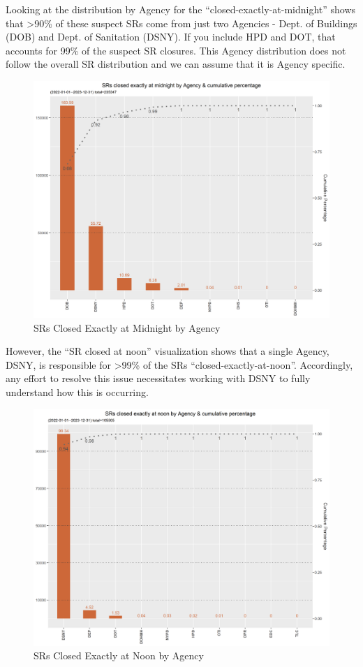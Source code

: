 \documentclass[12pt, titlepage]{article}
\begin{document}
	Looking at the distribution by Agency for the ``closed-exactly-at-midnight'' shows that \textgreater{}90\% of these suspect SRs come from just two Agencies - Dept. of 
	Buildings (DOB) and Dept. of Sanitation (DSNY). If you include HPD and DOT, that accounts for 99\% of the suspect SR closures. This Agency
	distribution does not follow the overall SR distribution and we can assume that it is Agency specific. 

	\begin{figure}[H]
		 \centering
		 \includegraphics[scale = 0.65]{closed_at_midnight_chart.png}
		 \caption{SRs Closed Exactly at Midnight by Agency}
		 \label{fig:midnight-closed}
	\end{figure}	

	However, the ``SR closed at noon'' visualization shows that  a single Agency, DSNY,
	is responsible for \textgreater{}99\% of the SRs ``closed-exactly-at-noon''. Accordingly, any effort to resolve this issue
	necessitates working with DSNY to fully understand how this is occurring. 
	
	\begin{figure}[H]
		 \centering
		 \includegraphics[scale = 0.65]{closed_at_noon_chart.png}
		 \caption{SRs Closed Exactly at Noon by Agency}
		 \label{fig:noon-closed}
	\end{figure}	
	
\end{document}
